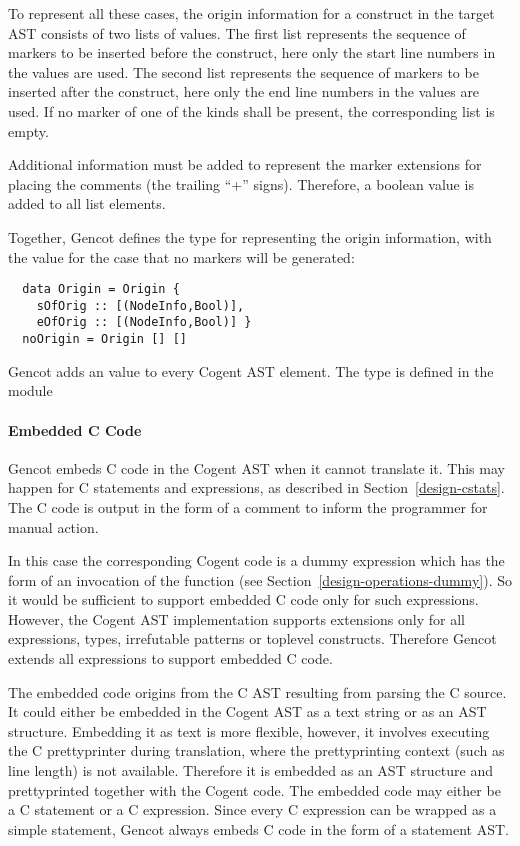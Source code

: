 To represent all these cases, the origin information for a construct in the target AST consists of two lists of 
values. The first list represents the sequence of  markers to be inserted before the construct, here only the
start line numbers in the  values are used. The second list represents the sequence of  markers 
to be inserted after the construct, here only the end line numbers in the  values are used. If no marker of
one of the kinds shall be present, the corresponding list is empty.

Additional information must be added to represent the marker extensions for placing the comments (the trailing ``+'' signs).
Therefore, a boolean value is added to all list elements.

Together, Gencot defines the type  for representing the origin information, with the value 
for the case that no markers will be generated:
\begin{verbatim}
  data Origin = Origin { 
    sOfOrig :: [(NodeInfo,Bool)], 
    eOfOrig :: [(NodeInfo,Bool)] } 
  noOrigin = Origin [] []
\end{verbatim}
Gencot adds an  value to every Cogent AST element. The type  is defined in the module 

\paragraph{Embedded C Code}

Gencot embeds C code in the Cogent AST when it cannot translate it. This may happen for C statements and expressions, as
described in Section~\ref{design-cstats}. The C code is output in the form of a comment to inform the programmer for 
manual action.

In this case the corresponding Cogent code is a dummy expression which has the form of an invocation of the function
 (see Section~\ref{design-operations-dummy}). So it would be sufficient to support embedded C code
only for such expressions. However, the Cogent AST implementation supports extensions only for all expressions, types, 
irrefutable patterns or toplevel constructs. Therefore Gencot extends all expressions to support embedded C code.

The embedded code origins from the C AST resulting from parsing the C source. It could either be embedded in the Cogent 
AST as a text string or as an AST structure. Embedding it as text is more flexible, however, it involves executing the 
C prettyprinter during translation, where the prettyprinting context (such as line length) is not available. Therefore 
it is embedded as an AST structure and prettyprinted together with the Cogent code. The embedded code may either be a 
C statement or a C expression. Since every C expression can be wrapped as a simple statement, Gencot always embeds C
code in the form of a statement AST.

